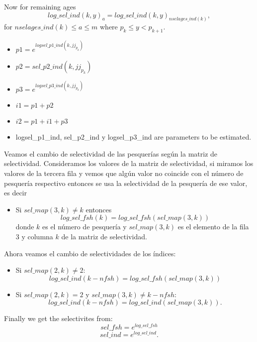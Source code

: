 \documentclass{article}
\begin{document}
\begin{itemize}
    Now for remaining ages
    \begin{equation}
         log\_sel\_ind(k,y)_a = log\_sel\_ind(k,y)_{nselages\_ind(k)},
    \end{equation}
    for $nselages\_ind(k)\leq a \leq m$ where $p_k\leq y < p_{k+1}$.
\begin{itemize}
    \item $p1 = e^{logsel\_p1\_ind(k,jj_{p_k})}$
    \item $p2 = sel\_p2\_ind(k,jj_{p_k})$
    \item $p3 = e^{logsel\_p3\_ind(k,jj_{p_k})}$
    \item $i1 = p1 + p2$
    \item $i2 = p1 + i1 + p3$
    \item logsel\_p1\_ind, sel\_p2\_ind y logsel\_p3\_ind are parameters to be estimated.
\end{itemize}
Veamos el cambio de selectividad de las pesquerías según la matriz de selectividad.
Consideramos los valores de la matriz de selectividad, si miramos los valores de la tercera fila y vemos que algún valor no coincide con el número de pesquería respectivo entonces se usa la selectividad de la pesquería de ese valor, es decir
\begin{itemize}
    \item Si $sel\_map(3,k) \neq k$ entonces
    \begin{equation}
        log\_sel\_fsh(k)=log\_sel\_fsh(sel\_map(3,k))
    \end{equation}
    donde $k$ es el número de pesquería y $sel\_map(3,k)$ es el elemento de la fila 3 y columna $k$ de la matriz de selectividad. 
\end{itemize}

Ahora veamos el cambio de selectividades de los índices:
\begin{itemize}
    \item Si $sel\_map(2,k) \neq 2$:
    \begin{equation}
        log\_sel\_ind(k-nfsh)=log\_sel\_fsh(sel\_map(3,k))
    \end{equation}
    \item Si $sel\_map(2,k) = 2$ y $sel\_map(3,k) \neq k-nfsh$:
    \begin{equation}
        log\_sel\_ind(k-nfsh) = log\_sel\_ind(sel\_map(3,k)).
    \end{equation}
\end{itemize}

   
\end{itemize}
Finally we get the selectivites from:
\begin{equation}
    sel\_fsh=e^{log\_sel\_fsh}
\end{equation}
\begin{equation}
    sel\_ind=e^{log\_sel\_ind}.
\end{equation}
\end{document}
